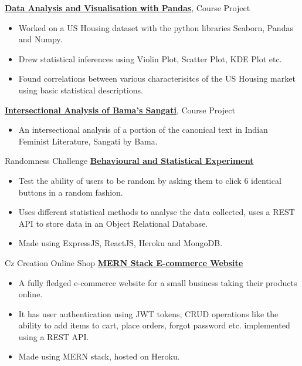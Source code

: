 {}
{\href{https://drive.google.com/file/d/1EF9wtUCJqQINYWiY4uFL4mmktJBL6r1b/view?usp=sharing}{\textbf{Data Analysis and Visualisation with Pandas}}, Course Project}
{
    \begin{itemize}
        \item Worked on a US Housing dataset with the python libraries Seaborn, Pandas and Numpy.
        \item Drew statistical inferences using Violin Plot, Scatter Plot, KDE Plot etc.
        \item Found correlations between various characterisitcs of the US Housing market using basic statistical descriptions.
    \end{itemize}
}
%
%
{}
{\href{https://drive.google.com/file/d/13pGjNeMmEKgKJDV8-RHDgqpyPXeEQqEc/view?usp=sharing}{\textbf{Intersectional Analysis of Bama's Sangati}}, Course Project}
{
    \begin{itemize}
        \item An intersectional analysis of a portion of the canonical text in Indian Feminist Literature, Sangati by Bama.
    \end{itemize}
}
%
%
{Randomness Challenge}
{\href{https://randomnesschallenge-71zq.onrender.com/}{\textbf{Behavioural and Statistical Experiment}}}
{
    \begin{itemize}
        \item Test the ability of users to be random by asking them to click 6 identical buttons in a random fashion.
        \item Uses different statistical methods to analyse the data collected, uses a REST API to store data in an Object Relational Database.
        \item Made using ExpressJS, ReactJS, Heroku and MongoDB.
    \end{itemize}
}
%
%
{Cz Creation Online Shop}
{\href{https://czcreation.onrender.com/}{\textbf{MERN Stack E-commerce Website}}}
{
    \begin{itemize}
        \item A fully fledged e-commerce website for a small business taking their products online.
        \item It has user authentication using JWT tokens, CRUD operations like the ability to add items to cart, place orders, forgot password etc. implemented using a REST API.
        \item Made using MERN stack, hosted on Heroku.
    \end{itemize}
}
